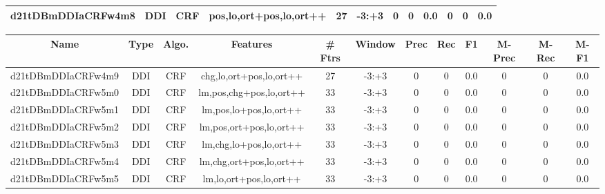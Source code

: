 \documentclass[a4paper]{article}
\begin{document}
\begin{landscape}
\begin{center}
\begin{tabular}{ |c|c|c|c|c|c|c|c|c|c|c|c|}
 
 	
 	\small{ d21tDBmDDIaCRFw4m8 } & \small{ DDI} & \small{  CRF }  & pos,lo,ort+pos,lo,ort++  &  27 &  \small{  -3:+3 }  &  0 & 0 & 0.0  &  0 & 0 & 0.0 \\
 	
 \hline
\end{tabular}
\end{center}




\begin{center}
\begin{tabular}{ |c|c|c|c|c|c|c|c|c|c|c|c|} 
 \hline
 	Name & Type & Algo. & Features & \# Ftrs & Window & Prec & Rec & F1 & M-Prec & M-Rec & M-F1\\
 \hline

 	

 
 	
 	\small{ d21tDBmDDIaCRFw4m9 } & \small{ DDI} & \small{  CRF }  & chg,lo,ort+pos,lo,ort++  &  27 &  \small{  -3:+3 }  &  0 & 0 & 0.0  &  0 & 0 & 0.0 \\
 	

 
 	
 	\small{ d21tDBmDDIaCRFw5m0 } & \small{ DDI} & \small{  CRF }  & lm,pos,chg+pos,lo,ort++  &  33 &  \small{  -3:+3 }  &  0 & 0 & 0.0  &  0 & 0 & 0.0 \\
 	

 
 	
 	\small{ d21tDBmDDIaCRFw5m1 } & \small{ DDI} & \small{  CRF }  & lm,pos,lo+pos,lo,ort++  &  33 &  \small{  -3:+3 }  &  0 & 0 & 0.0  &  0 & 0 & 0.0 \\
 	

 
 	
 	\small{ d21tDBmDDIaCRFw5m2 } & \small{ DDI} & \small{  CRF }  & lm,pos,ort+pos,lo,ort++  &  33 &  \small{  -3:+3 }  &  0 & 0 & 0.0  &  0 & 0 & 0.0 \\
 	

 
 	
 	\small{ d21tDBmDDIaCRFw5m3 } & \small{ DDI} & \small{  CRF }  & lm,chg,lo+pos,lo,ort++  &  33 &  \small{  -3:+3 }  &  0 & 0 & 0.0  &  0 & 0 & 0.0 \\
 	

 
 	
 	\small{ d21tDBmDDIaCRFw5m4 } & \small{ DDI} & \small{  CRF }  & lm,chg,ort+pos,lo,ort++  &  33 &  \small{  -3:+3 }  &  0 & 0 & 0.0  &  0 & 0 & 0.0 \\
 	

 
 	
 	\small{ d21tDBmDDIaCRFw5m5 } & \small{ DDI} & \small{  CRF }  & lm,lo,ort+pos,lo,ort++  &  33 &  \small{  -3:+3 }  &  0 & 0 & 0.0  &  0 & 0 & 0.0 \\
 	


\end{tabular}
\end{center}
\end{landscape}
\end{document}
